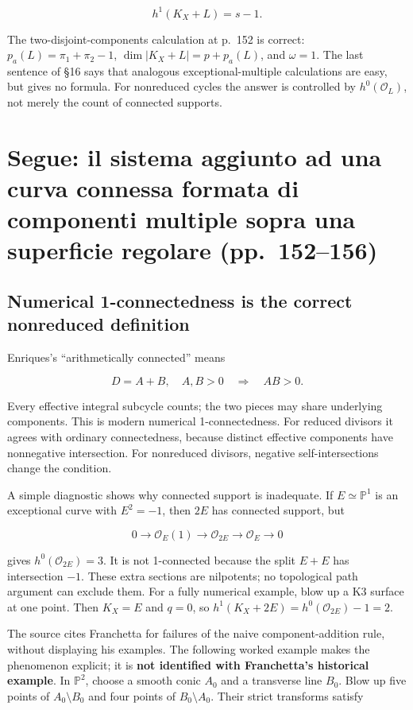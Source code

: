 \[
h^1(K_X+L)=s-1.
\tag{IV.16.1}
\]

The two-disjoint-components calculation at p.~152 is correct: \(p_a(L)=\pi_1+\pi_2-1\), \(\dim|K_X+L|=p+p_a(L)\), and \(\omega=1\). The last sentence of §16 says that analogous exceptional-multiple calculations are easy, but gives no formula. For nonreduced cycles the answer is controlled by \(h^0(\mathcal O_L)\), not merely the count of connected supports.

\section[Aggiunti di curve nonridotte]{Segue: il sistema aggiunto ad una curva connessa formata di componenti multiple sopra una superficie regolare (pp.~152--156)}\label{enriques-iv-17}

\subsection{Numerical 1-connectedness is the correct nonreduced definition}

Enriques's ``arithmetically connected'' means

\[
D=A+B,\quad A,B>0\quad\Longrightarrow\quad AB>0.
\tag{IV.17.1}
\]

Every effective integral subcycle counts; the two pieces may share underlying components. This is modern numerical 1-connectedness. For reduced divisors it agrees with ordinary connectedness, because distinct effective components have nonnegative intersection. For nonreduced divisors, negative self-intersections change the condition.

A simple diagnostic shows why connected support is inadequate. If \(E\simeq\mathbb P^1\) is an exceptional curve with \(E^2=-1\), then \(2E\) has connected support, but

\[
0\to\mathcal O_E(1)\to\mathcal O_{2E}\to\mathcal O_E\to0
\]

gives \(h^0(\mathcal O_{2E})=3\). It is not 1-connected because the split \(E+E\) has intersection \(-1\). These extra sections are nilpotents; no topological path argument can exclude them. For a fully numerical example, blow up a K3 surface at one point. Then \(K_X=E\) and \(q=0\), so \(h^1(K_X+2E)=h^0(\mathcal O_{2E})-1=2\).

The source cites Franchetta for failures of the naive component-addition rule, without displaying his examples. The following worked example makes the phenomenon explicit; it is \textbf{not identified with Franchetta's historical example}. In \(\mathbb P^2\), choose a smooth conic \(A_0\) and a transverse line \(B_0\). Blow up five points of \(A_0\setminus B_0\) and four points of \(B_0\setminus A_0\). Their strict transforms satisfy

